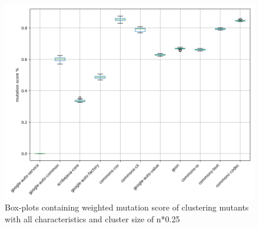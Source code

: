 \documentclass[../../main]{subfiles}
\begin{document}
\begin{figure}[H]
\includegraphics[width=\textwidth]{images/boxplot_summary/boxplot_hc_full_0.25.png}
\caption{\label{box:clustering_all_25}Box-plots containing weighted mutation score of clustering mutants with all characteristics and cluster size of n*0.25}
\end{figure}
\end{document}

